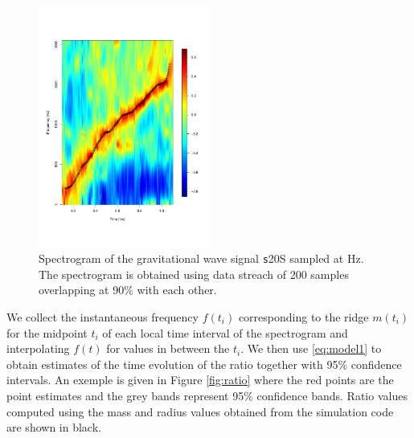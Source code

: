 \begin{figure}
 \centering
 \includegraphics[width=0.5\textwidth,height=0.3\textheight]{plots/spectrogram}
 \caption{Spectrogram of the gravitational wave signal {\texttt s20S} sampled at \unit[4096]{Hz}.
   The spectrogram is obtained using data streach of 200 samples overlapping at 90\%
   with each other.} \label{fig:spectrogram}
\end{figure}


We collect the instantaneous frequency $f(t_i)$ corresponding to the ridge $m(t_i)$ for
the midpoint $t_i$ of each local time interval of the spectrogram and interpolating $f(t)$
for values in between the $t_i$. We then use 
\eqref{eq:model1} to obtain
estimates of the time evolution of the ratio together with 95\% confidence intervals.
An exemple is given in Figure \ref{fig:ratio} where the red points are the point estimates and
the grey bands represent 95\% confidence bands. Ratio values
computed using the mass and radius values obtained from the simulation code  are shown in black.

